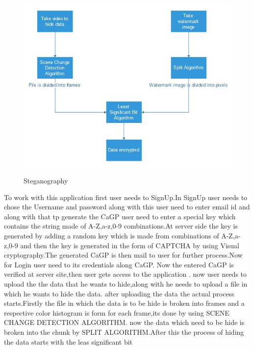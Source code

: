 \documentclass[12pt]{extreport}
\begin{document}
	
	
\begin{figure}[H]


	\includegraphics[scale=0.75]{3p.JPG}\\
	\caption{Steganography}
	
	\end{figure}


\hspace*{0.01em}
To work with this application first user needs to SignUp.In SignUp user needs to chose the Username and password along with this user need to enter email id and along with that tp generate the CaGP user need to enter a special key which contains the  string made of A-Z,a-z,0-9 combinations.At server side the key is generated by adding a random key which is made from combinations of A-Z,a-z,0-9 and then the key is generated in the form of CAPTCHA by using Visual cryptography.The generated CaGP is then mail to user for further process.Now for Login user need to its credentials along CaGP.
Now the entered CaGP is verified at server site,then user gets access to the application .
now user needs to upload the the data that he wants to hide,along with he needs to upload a file in which he wants to hide the data.
after uploading the data the actual process starts.Firstly the file in which the data is to be hide is broken into frames and a respective color histogram is form for each frame,its done by using SCENE CHANGE DETECTION ALGORITHM.
now the data which need to be hide is broken into the chunk by SPLIT ALGORITHM.After this the process of hiding the data starts with the leas significant bit
\end{document}
